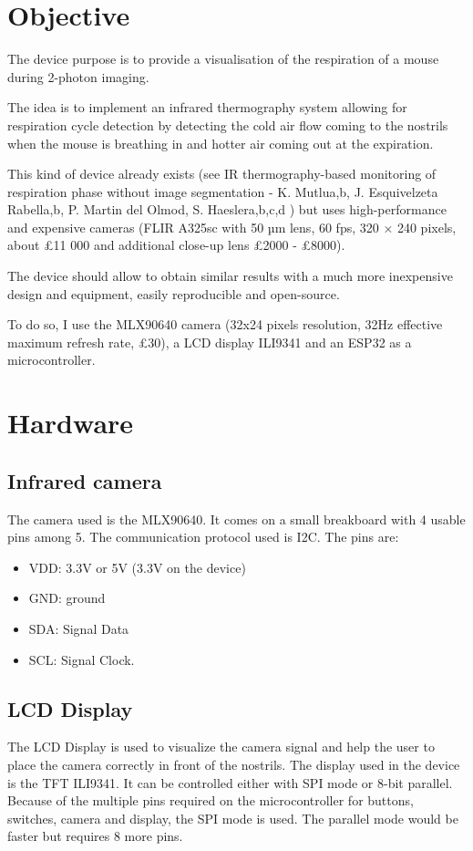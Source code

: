 \documentclass[a4paper]{article}
\begin{document}
\section{Objective}
The device purpose is to provide a visualisation of the respiration of a mouse during 2-photon imaging.

The idea is to implement an infrared thermography system allowing for respiration cycle detection by detecting the cold air flow coming to the nostrils when the mouse is breathing in and hotter air coming out at the expiration. 

This kind of device already exists (see IR thermography-based monitoring of respiration phase without
image segmentation - K. Mutlua,b, J. Esquivelzeta Rabella,b, P. Martin del Olmod, S. Haeslera,b,c,d ) but uses high-performance and expensive cameras (FLIR A325sc with 50 µm lens, 60 fps, 320 × 240 pixels, about £11 000 and additional close-up lens £2000 - £8000). 

The device should allow to obtain similar results with a much more inexpensive design and equipment, easily reproducible and open-source.

To do so, I use the MLX90640 camera (32x24 pixels resolution, 32Hz effective maximum refresh rate, £30), a LCD display ILI9341 and an ESP32 as a microcontroller.

\section{Hardware}
\subsection{Infrared camera}
The camera used is the MLX90640. It comes on a small breakboard with 4 usable pins among 5. The communication protocol used is I2C.
The pins are:
\begin{itemize}
    \item VDD: 3.3V or 5V (3.3V on the device)
    \item GND: ground
    \item SDA: Signal Data
    \item SCL: Signal Clock.
\end{itemize}


\subsection{LCD Display}
The LCD Display is used to visualize the camera signal and help the user to place the camera correctly in front of the nostrils.
The display used in the device is the TFT ILI9341. It can be controlled either with SPI mode or 8-bit parallel. Because of the multiple pins required on the microcontroller for buttons, switches, camera and display, the SPI mode is used. The parallel mode would be faster but requires 8 more pins.
\end{document}
